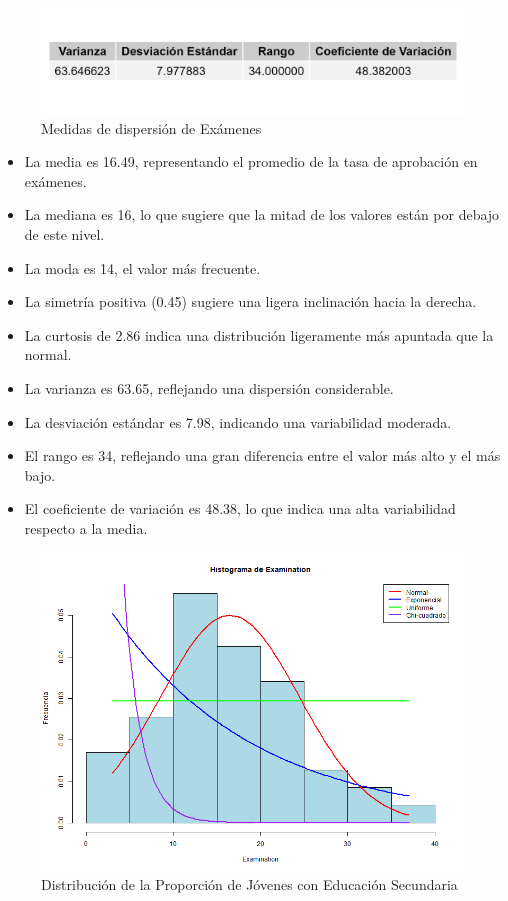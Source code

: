 \documentclass{article}
\begin{document}
\begin{figure}[h!]
 \centering
 \includegraphics[width=\textwidth]{Swiss/Examination_dispersion.png}
 \caption{Medidas de dispersión de Exámenes}
\end{figure}
   \begin{itemize}
       \item La media es 16.49, representando el promedio de la tasa de aprobación en exámenes.
       \item La mediana es 16, lo que sugiere que la mitad de los valores están por debajo de este nivel.
       \item La moda es 14, el valor más frecuente.
       \item La simetría positiva (0.45) sugiere una ligera inclinación hacia la derecha.
       \item La curtosis de 2.86 indica una distribución ligeramente más apuntada que la normal.
       \item La varianza es 63.65, reflejando una dispersión considerable.
       \item La desviación estándar es 7.98, indicando una variabilidad moderada.
       \item El rango es 34, reflejando una gran diferencia entre el valor más alto y el más bajo.
       \item El coeficiente de variación es 48.38, lo que indica una alta variabilidad respecto a la media.
   \end{itemize}

   \begin{figure}[h!]
    \centering
    \includegraphics[width=\textwidth]{Histogramas/histogram_examination.png}
    \caption{Distribución de la Proporción de Jóvenes con Educación Secundaria}
    \end{figure}
\end{document}
